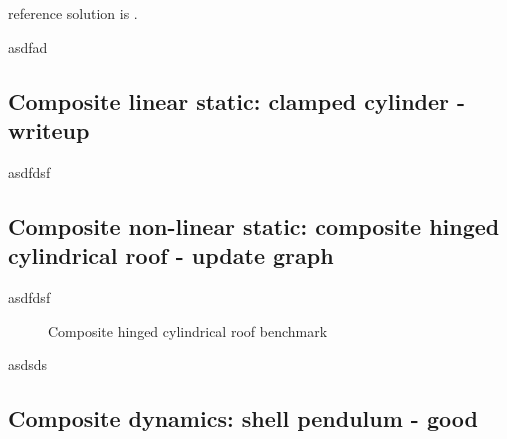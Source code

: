 reference solution is \cite{reddy2004mechanics}.

asdfad

\subsection{Composite linear static: clamped cylinder - writeup}

asdfdsf

\subsection{Composite non-linear static: composite hinged cylindrical roof - update graph}

asdfdsf

\begin{figure}[H]
	\caption{\label{ref_label_overall}Composite hinged cylindrical roof benchmark}
\end{figure}

asdsds

\subsection{Composite dynamics: shell pendulum - good}

